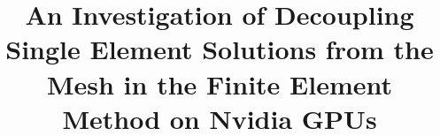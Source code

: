\documentclass[a4paper, oneside, 11pt]{report}
\title{An Investigation of Decoupling Single Element Solutions from the Mesh in the Finite Element Method on Nvidia GPUs}
\begin{document}









\clearpage



\tableofcontents
\clearpage
{}
\listoffigures
\clearpage
{}
\listoftables
\clearpage
{}
















\clearpage
\renewcommand*{\thesection}{}\textbf{}






\appendix
\renewcommand*{\thesection}{\Alph{section}}\textbf{}

\begin{appendices}

\end{appendices}
\end{document}
